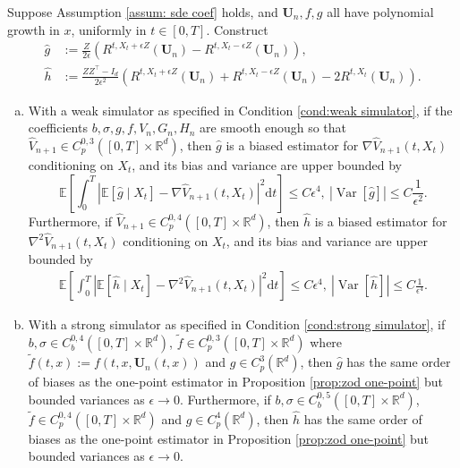 \documentclass[twoside,11pt]{article}
\newcommand{\dd}{\mathrm{d}}
\newcommand{\E}{\mathbb{E}}
\newcommand{\R}{\mathbb{R}}
\newcommand{\1}{\mathbf{1}}
\numberwithin{equation}{section}
\begin{document}
\begin{proposition}\label{prop: zod variance reduction}
Suppose Assumption \ref{assum: sde coef} holds, and $\mathbf{U}_n,f,g$ all have polynomial growth in $x$, uniformly in $t\in[0,T]$. %
Construct
    \begin{equation}
    \begin{aligned}
        \hat g &:= \frac{Z}{2\epsilon} \left(R^{t,X_t + \epsilon Z}(\mathbf{U}_n) - R^{t,X_t - \epsilon Z}(\mathbf{U}_n)\right),\\
        \hat h &:= \frac{ZZ^{\top}-I_d}{2\epsilon^2}\left(R^{t,X_t + \epsilon Z}(\mathbf{U}_n) + R^{t,X_t - \epsilon Z}(\mathbf{U}_n)  - 2R^{t,X_t}(\mathbf{U}_n)\right).
        \end{aligned}
    \end{equation}
\begin{enumerate}[(a)]
\item With a weak simulator as specified in Condition \ref{cond:weak simulator}, if the coefficients $ b,\sigma, g,f,V_n,G_n,H_n$ are smooth enough so that $ \hat V_{n+1}\in C_p^{0,3}([0,T]\times\R^d)$, then $ \hat g$ is a biased estimator for $ \nabla \hat V_{n+1}(t,X_t)$ conditioning on $ X_t$, and its bias and variance are upper bounded by
\begin{equation}
    \E\left[ \int_0^T \left| \E\left[ \hat g\mid X_t\right] - \nabla \hat V_{n+1}(t,X_t)\right|^2\dd t\right] \le C\epsilon^4, \ \left|\operatorname{Var}[\hat g]\right| \le C\frac{1}{\epsilon^2}.
\end{equation}
Furthermore, if $\hat V_{n+1} \in C_p^{0,4}([0,T]\times\R^d)$, then $ \hat h$ is a biased estimator for $ \nabla^2 \hat V_{n+1}(t,X_t)$ conditioning on $ X_t$, and its bias and variance are upper bounded by
\begin{equation}
\begin{aligned}
    \E\left[\int_0^T\left|\E\left[\hat h \mid X_t\right]- \nabla^2 \hat V_{n+1}(t,X_t)\right|^2 \dd t \right] \le C\epsilon^4, \
    \left|\operatorname{Var}[ \hat h]\right| \le C\frac{1}{\epsilon^4}.
    \end{aligned}
\end{equation}
\item With a strong simulator as specified in Condition \ref{cond:strong simulator}, if $ b,\sigma \in C_b^{0,4}([0,T]\times\R^d)$, $\tilde f \in C_p^{0,3}([0,T]\times \R^d)$ where $\tilde f(t,x) := f(t,x,\mathbf{U}_n(t,x))$ and $g\in C_p^3(\R^d)$,  then $ \hat g$ has the same order of biases as the one-point estimator in Proposition \ref{prop:zod one-point}
    but bounded variances as $ \epsilon \rightarrow 0$.
    Furthermore, if $ b,\sigma \in C_b^{0,5}([0,T]\times\R^d)$, $ \tilde f \in C_p^{0,4}([0,T]\times\R^d)$ and $g\in C_p^4(\R^d)$,  then $ \hat h$ has the same order of biases as  the one-point estimator in Proposition \ref{prop:zod one-point}     but bounded variances as $ \epsilon \rightarrow 0$.
\end{enumerate}

\end{proposition}
\end{document}
